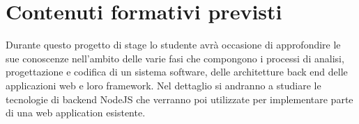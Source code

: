 \section*{Contenuti formativi previsti}
Durante questo progetto di stage lo studente avrà occasione di approfondire le 
sue conoscenze nell’ambito delle varie fasi che compongono i processi di analisi, 
progettazione e codifica di un sistema software, delle architetture back end 
delle applicazioni web e loro framework. Nel dettaglio si andranno a studiare le 
tecnologie di backend NodeJS che verranno poi utilizzate per implementare parte di 
una web application esistente.
\newpage